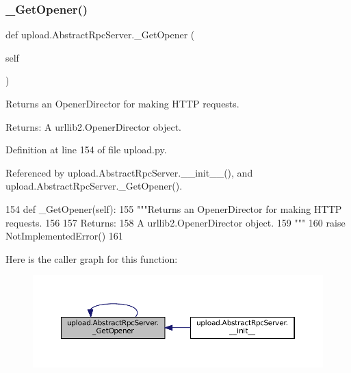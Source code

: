 \subsubsection{\texorpdfstring{\+\_\+\+Get\+Opener()}{\_GetOpener()}\hspace{0.1cm}{\footnotesize\ttfamily [2/2]}}
{\footnotesize\ttfamily def upload.\+Abstract\+Rpc\+Server.\+\_\+\+Get\+Opener (\begin{DoxyParamCaption}\item[{}]{self }\end{DoxyParamCaption})\hspace{0.3cm}{\ttfamily [private]}}

\begin{DoxyVerb}Returns an OpenerDirector for making HTTP requests.

Returns:
  A urllib2.OpenerDirector object.
\end{DoxyVerb}
 

Definition at line 154 of file upload.\+py.



Referenced by upload.\+Abstract\+Rpc\+Server.\+\_\+\+\_\+init\+\_\+\+\_\+(), and upload.\+Abstract\+Rpc\+Server.\+\_\+\+Get\+Opener().


\begin{DoxyCode}
154   \textcolor{keyword}{def }\_GetOpener(self):
155     \textcolor{stringliteral}{"""Returns an OpenerDirector for making HTTP requests.}
156 \textcolor{stringliteral}{}
157 \textcolor{stringliteral}{    Returns:}
158 \textcolor{stringliteral}{      A urllib2.OpenerDirector object.}
159 \textcolor{stringliteral}{    """}
160     \textcolor{keywordflow}{raise} NotImplementedError()
161 
\end{DoxyCode}
Here is the caller graph for this function\+:
\nopagebreak
\begin{figure}[H]
\begin{center}
\leavevmode
\includegraphics[width=350pt]{classupload_1_1AbstractRpcServer_a388a9974eab1157ba4785e2ab2c33be9_icgraph}
\end{center}
\end{figure}
\mbox{\label{classupload_1_1AbstractRpcServer_ac1b913f8bd00da4741c47ab49ea94cb5}} 
